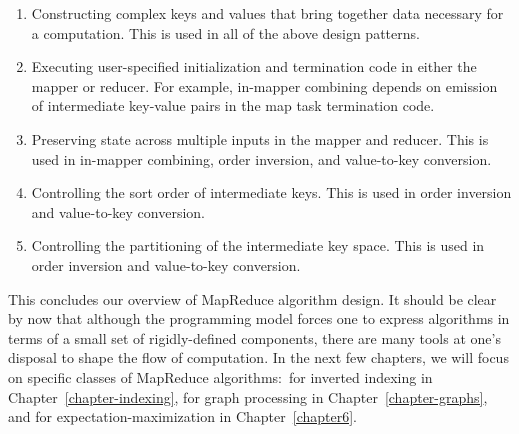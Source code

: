\documentclass[11pt]{article}
\begin{document}
\begin{enumerate}

\item Constructing complex keys and values that bring together data
  necessary for a computation.  This is used in all of the above
  design patterns.

\item Executing user-specified initialization and termination code in
  either the mapper or reducer.  For example, in-mapper combining
  depends on emission of intermediate key-value pairs in the map task
  termination code.

\item Preserving state across multiple inputs in the mapper and
  reducer.  This is used in in-mapper combining, order inversion, and
  value-to-key conversion.

\item Controlling the sort order of intermediate keys.  This is used
  in order inversion and value-to-key conversion.

\item Controlling the partitioning of the intermediate key space.
  This is used in order inversion and value-to-key conversion.

\end{enumerate}

\noindent This concludes our overview of MapReduce algorithm design.
It should be clear by now that although the programming model forces
one to express algorithms in terms of a small set of rigidly-defined
components, there are many tools at one's disposal to shape the flow
of computation.  In the next few chapters, we will focus on specific
classes of MapReduce algorithms:\ for inverted indexing in
Chapter~\ref{chapter-indexing}, for graph processing in
Chapter~\ref{chapter-graphs}, and for expectation-maximization in
Chapter~\ref{chapter6}.




\end{document}
